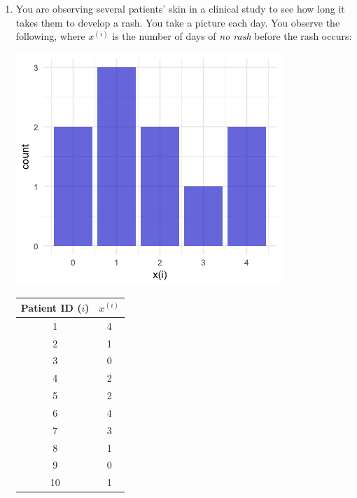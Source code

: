 \begin{enumerate}
\item You are observing several patients' skin in a clinical study to see how long it takes them to develop a rash. You take a picture each day. You observe the following, where $x^{(i)}$ is the number of days of \emph{no rash} before the rash occurs: 

\begin{minipage}[c]{0.5\textwidth}
\begin{center}
\includegraphics[width=\textwidth]{img/l01-problem2.png}
\end{center}
\end{minipage}
\begin{minipage}[c]{0.5\textwidth}
\begin{center}{\small
\begin{tabular}{cc}
\toprule
Patient ID ($i$) & $x^{(i)}$ \\
\midrule
1 & 4 \\
2 & 1 \\
3 & 0 \\
4 & 2 \\
5 & 2 \\
6 & 4 \\
7 & 3 \\
8 & 1 \\
9 & 0 \\
10 & 1 \\
\end{tabular}}
\end{center}
\end{minipage}
\vspace{3mm}


\end{enumerate}
